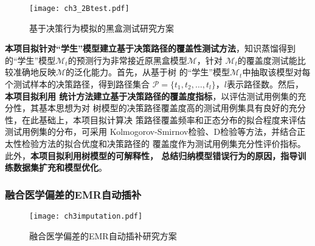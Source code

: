 \begin{figure}[htp]
    \begin{small}
        \begin{center}
            \texttt{[image: ch3\_2Btest.pdf]}
        \end{center}
        \caption{基于决策行为模拟的黑盒测试研究方案}
        \label{fig:ch3:2Btest}
    \end{small}
\end{figure}

\textbf{本项目拟针对``学生''模型建立基于决策路径的覆盖性测试方法}，知识蒸馏得到
的``学生''模型$\mathcal M_t$的预测行为非常接近原黑盒模型$\mathcal M$，针对
$\mathcal M_t$的覆盖度测试能比较准确地反映$\mathcal M$的泛化能力。首先，从基于树
的``学生''模型$\mathcal M_t$中抽取该模型对每个测试样本的决策路径，得到路径集合
$\mathcal P=\{t_1, t_2,\dots, t_l\}$，$l$表示路径数。然后，\textbf{本项目拟利用
统计方法建立基于决策路径的覆盖度指标}，以评估测试用例集的充分性，其基本思想为对
树模型的决策路径覆盖度高的测试用例集具有良好的充分性，在此基础上，本项目拟计算决
策路径覆盖频率和正态分布的拟合程度来评估测试用例集的分布，可采用
Kolmogorov-Smirnov检验、D检验等方法，并结合正太性检验方法的拟合优度和决策路径的
覆盖度作为测试用例集充分性评价指标。此外，\textbf{本项目拟利用树模型的可解释性，
总结归纳模型错误行为的原因，指导训练数据集扩充和模型优化}。

\subsubsection{融合医学偏差的EMR自动插补}\label{ch3_2}

\begin{comment}
融合医学偏差的EMR自动插补旨在将在时间维度上不规则的电子医疗记录补全为完整的电子
医疗记录，可降低后续预测模型的复杂度和训练时间。电子医疗记录除了反映患者的身体健
康状态，还包含的患者与医院、医生与电子病历系统的交互过程，通常这些附加因素会引入
医学偏差。研究表明，医学偏差可用于对患者更精细的分类，对于理解电子医疗记录有重要
辅助作用，许多医学偏差都会通过医疗特征被记录的时间推断出来，这为建模引入医学偏差
提供了理论基础。本项目利用医疗特征记录的时间和电子医疗记录中缺失值出现的位置，学
习特征的缺失规律，进而将所学缺失规律融入插补模型中。
\end{comment}

\begin{figure}
    \begin{small}
        \begin{center}
            \texttt{[image: ch3imputation.pdf]}
        \end{center}
        \caption{融合医学偏差的EMR自动插补研究方案}
        \label{fig:ch3:imputation}
    \end{small}
\end{figure}

